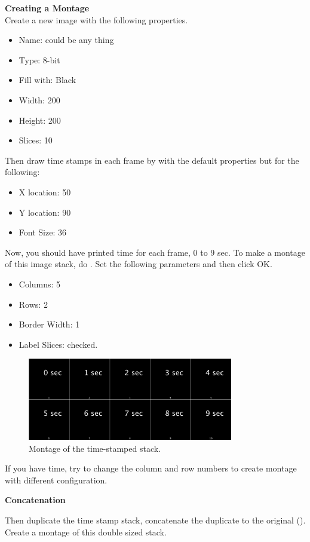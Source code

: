 \begin{indentexercise}{3}
\textbf{Creating a Montage}\\
Create a new image  with the following properties. 
\begin{itemize}
\item Name: could be any thing
\item Type: 8-bit
\item Fill with: Black
\item Width: 200
\item Height: 200
\item Slices: 10
\end{itemize}
Then draw time stamps in each frame by  with the default properties but for the following:
\begin{itemize}
\item X location: 50
\item Y location: 90
\item Font Size: 36
\end{itemize}

Now, you should have printed time for each frame, 0 to 9 sec. To make a montage of this image stack, do . Set the following parameters and then click OK. 
\begin{itemize}
\item Columns: 5
\item Rows: 2
\item Border Width: 1
\item Label Slices: checked.
\end{itemize}

\begin{figure}[h!]
\begin{center}
\includegraphics[width=0.8\textwidth]{fig/TimeStampMontage.png}
\caption{Montage of the time-stamped stack.}
\label{fig:editStack2}
\end{center}
\end{figure}

If you have time, try to change the column and row numbers to create montage with different configuration. 

\textbf{Concatenation}

Then duplicate the time stamp stack, concatenate the duplicate to the original (). Create a montage of this double sized stack. 

\end{indentexercise}


